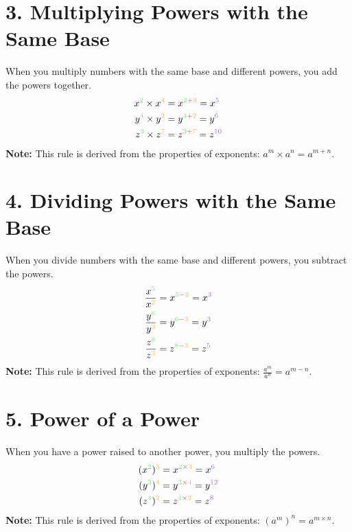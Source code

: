 \documentclass[12pt]{article}
\begin{document}
\section*{3. Multiplying Powers with the Same Base}
When you multiply numbers with the same base and different powers, you add the powers together.
\begin{align*}
    x^{{\color{factorA}2}} \times x^{{\color{factorB}3}} & = x^{{\color{factorA}2} {\color{operator}+} {\color{factorB}3}} = x^{{\color{alternate}5}} \\
    y^{{\color{factorA}4}} \times y^{{\color{factorB}2}} & = y^{{\color{factorA}4} {\color{operator}+} {\color{factorB}2}} = y^{{\color{alternate}6}} \\
    z^{{\color{factorA}3}} \times z^{{\color{factorB}7}} & = z^{{\color{factorA}3} {\color{operator}+} {\color{factorB}7}} = z^{{\color{alternate}10}}
\end{align*}
\textbf{Note:} This rule is derived from the properties of exponents: \(a^m \times a^n = a^{m+n}\).

\section*{4. Dividing Powers with the Same Base}
When you divide numbers with the same base and different powers, you subtract the powers.
\begin{align*}
    \frac{x^{{\color{factorA}5}}}{x^{{\color{factorB}2}}} & = x^{{\color{factorA}5} {\color{operator}-} {\color{factorB}2}} = x^{{\color{alternate}3}} \\
    \frac{y^{{\color{factorA}6}}}{y^{{\color{factorB}3}}} & = y^{{\color{factorA}6} {\color{operator}-} {\color{factorB}3}} = y^{{\color{alternate}3}} \\
    \frac{z^{{\color{factorA}8}}}{z^{{\color{factorB}3}}} & = z^{{\color{factorA}8} {\color{operator}-} {\color{factorB}3}} = z^{{\color{alternate}5}}
\end{align*}
\textbf{Note:} This rule is derived from the properties of exponents: \(\frac{a^m}{a^n} = a^{m-n}\).


\section*{5. Power of a Power}
When you have a power raised to another power, you multiply the powers.
\begin{align*}
    (x^{{\color{factorA}2}})^{{\color{factorB}3}} & = x^{{\color{factorA}2} {\color{operator}\times} {\color{factorB}3}} = x^{{\color{alternate}6}} \\
    (y^{{\color{factorA}3}})^{{\color{factorB}4}} & = y^{{\color{factorA}3} {\color{operator}\times} {\color{factorB}4}} = y^{{\color{alternate}12}} \\
    (z^{{\color{factorA}4}})^{{\color{factorB}2}} & = z^{{\color{factorA}4} {\color{operator}\times} {\color{factorB}2}} = z^{{\color{alternate}8}}
\end{align*}
\textbf{Note:} This rule is derived from the properties of exponents: \((a^m)^n = a^{m \times n}\).
\end{document}
